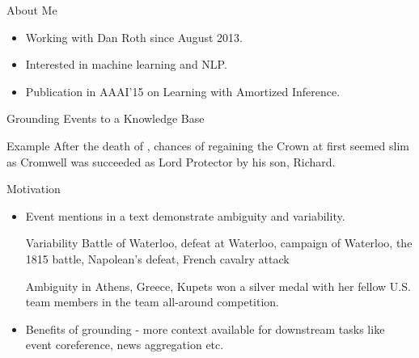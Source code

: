\begin{frame}{About Me}
  \begin{itemize}
  \item Working with Dan Roth since August 2013.
  \item Interested in machine learning and NLP.
  \item Publication in AAAI'15 on Learning with Amortized Inference.
  \end{itemize}
\end{frame}

\begin{frame}{Grounding Events to a Knowledge Base}
  \begin{block}{Example}
    After the { death of },  chances of regaining the Crown at first seemed slim as Cromwell was succeeded as Lord Protector by his son, Richard.
  \end{block}
\end{frame}

\begin{frame}{Motivation}
  \begin{itemize}[<+->]
  \item Event mentions in a text demonstrate ambiguity and variability.
    \begin{exampleblock}{Variability}
      {Battle of Waterloo, defeat at Waterloo, campaign of Waterloo, the 1815 battle, Napolean's defeat, French cavalry attack}
    \end{exampleblock}

    \begin{exampleblock}{Ambiguity}
      { in Athens, Greece, Kupets won a silver medal with her fellow U.S. team members in the team all-around competition.}
    \end{exampleblock}
  \item Benefits of grounding - more context available for downstream tasks like event coreference, news aggregation etc.
  \end{itemize}
\end{frame}

